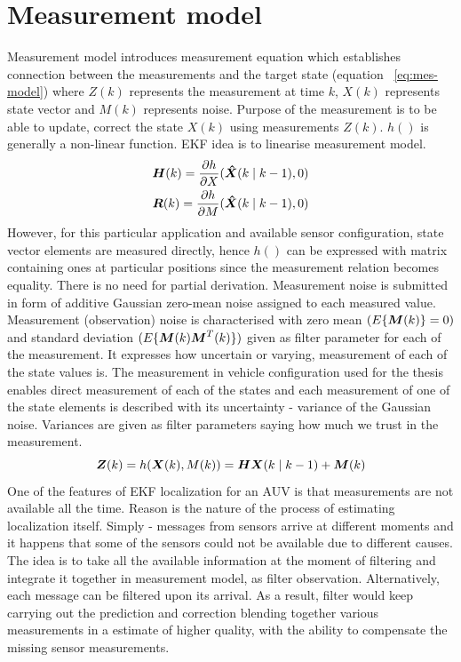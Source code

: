 \section{Measurement model} \label{sec:measurement-model}
Measurement model introduces measurement equation which establishes connection between the measurements and the target state (equation ~\ref{eq:mes-model}) where $Z(k)$ represents the measurement at time $k$, $X(k)$ represents state vector and $M(k)$ represents noise. Purpose of the measurement is to be able to update, correct the state $X(k)$ using measurements $Z(k)$. $h()$ is generally a non-linear function. EKF idea is to linearise measurement model.
\begin{align*}
\boldsymbol{H}(k) = \frac{\partial h}{\partial X} (\boldsymbol{\hat{X}}(k \mid k-1), 0) \\
\boldsymbol{R}(k) = \frac{\partial h}{\partial M} (\boldsymbol{\hat{X}}(k \mid k-1), 0)
\end{align*}
However, for this particular application and available sensor configuration, state vector elements are measured directly, hence $h()$ can be expressed with matrix containing ones at particular positions since the measurement relation becomes equality. There is no need for partial derivation. Measurement noise is submitted in form of additive Gaussian zero-mean noise assigned to each measured value. Measurement (observation) noise is characterised with zero mean $(E \lbrace \boldsymbol{M}(k) \rbrace = 0)$ and standard deviation $(E \lbrace \boldsymbol{M}(k) \boldsymbol{M}^{T}(k) \rbrace)$ given as filter parameter for each of the measurement. It expresses how uncertain or varying, measurement of each of the state values is. The measurement in vehicle configuration used for the thesis enables direct measurement of each of the states and each measurement of one of the state elements is described with its uncertainty - variance of the Gaussian noise. Variances are given as filter parameters saying how much we trust in the measurement.  
\begin{equation}
\boldsymbol{Z}(k) = h(\boldsymbol{X}(k), M(k)) = \boldsymbol{H} \boldsymbol{X}(k \mid k-1)  + \boldsymbol{M}(k)
\label{eq:mes-model}
\end{equation}
One of the features of EKF localization for an AUV is that measurements are not available all the time. Reason is the nature of the process of estimating localization itself. Simply - messages from sensors arrive at different moments and it happens that some of the sensors could not be available due to different causes. The idea is to take all the available information at the moment of filtering and integrate it together in measurement model, as filter observation. Alternatively, each message can be filtered upon its arrival. As a result, filter would keep carrying out the prediction and correction blending together various measurements in a estimate of higher quality, with the ability to compensate the missing sensor measurements. 

